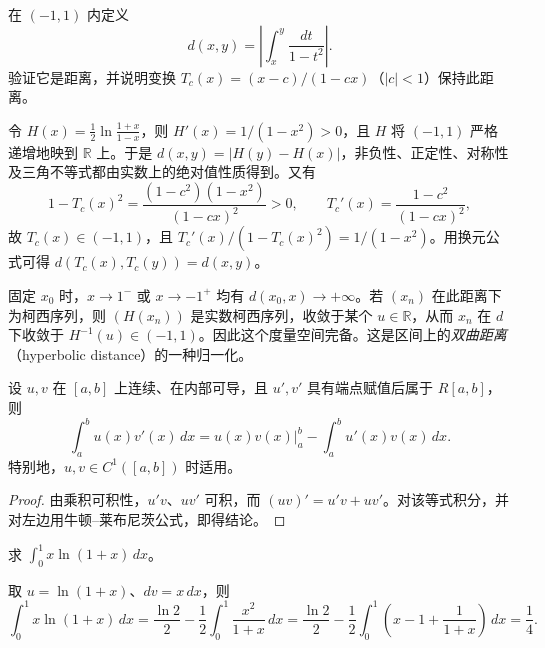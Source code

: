 \documentclass[UTF8,12pt,a4paper,fontset=fandol]{ctexbook}
\begin{document}
\begin{example}
\label{ex:hyperbolic-distance-on-interval}
在 $(-1,1)$ 内定义
\[
    d(x,y)=\left|\int_x^y\frac{dt}{1-t^2}\right|.
\]
验证它是距离，并说明变换 $T_c(x)=(x-c)/(1-cx)$（$|c|<1$）保持此距离。
\end{example}
\begin{solve}
令 $H(x)=\frac12\ln\frac{1+x}{1-x}$，则 $H'(x)=1/(1-x^2)>0$，且 $H$ 将 $(-1,1)$ 严格递增地映到 $\mathbb R$ 上。于是 $d(x,y)=|H(y)-H(x)|$，非负性、正定性、对称性及三角不等式都由实数上的绝对值性质得到。又有
\[
    1-T_c(x)^2=\frac{(1-c^2)(1-x^2)}{(1-cx)^2}>0,\qquad
    T_c'(x)=\frac{1-c^2}{(1-cx)^2},
\]
故 $T_c(x)\in(-1,1)$，且 $T_c'(x)/(1-T_c(x)^2)=1/(1-x^2)$。用换元公式可得 $d(T_c(x),T_c(y))=d(x,y)$。

固定 $x_0$ 时，$x\to1^-$ 或 $x\to-1^+$ 均有 $d(x_0,x)\to+\infty$。若 $(x_n)$ 在此距离下为柯西序列，则 $(H(x_n))$ 是实数柯西序列，收敛于某个 $u\in\mathbb R$，从而 $x_n$ 在 $d$ 下收敛于 $H^{-1}(u)\in(-1,1)$。因此这个度量空间完备。这是区间上的\emph{双曲距离}（hyperbolic distance）的一种归一化。
\end{solve}

\begin{theorem}[定积分分部积分公式]
\label{thm:definite-integration-by-parts}
设 $u,v$ 在 $[a,b]$ 上连续、在内部可导，且 $u',v'$ 具有端点赋值后属于 $R[a,b]$，则
\begin{equation}
    \int_a^b u(x)v'(x)\,dx
    =\left.u(x)v(x)\right|_a^b-\int_a^b u'(x)v(x)\,dx.
    \label{eq:definite-integration-by-parts}
\end{equation}
特别地，$u,v\in C^1([a,b])$ 时适用。
\end{theorem}
\begin{proof}
由乘积可积性，$u'v$、$uv'$ 可积，而 $(uv)'=u'v+uv'$。对该等式积分，并对左边用牛顿--莱布尼茨公式，即得结论。
\end{proof}

\begin{example}
\label{ex:integration-by-parts-logarithm}
求 $\displaystyle\int_0^1x\ln(1+x)\,dx$。
\end{example}
\begin{solve}
取 $u=\ln(1+x)$、$dv=x\,dx$，则
\[
    \int_0^1x\ln(1+x)\,dx
    =\frac{\ln2}{2}-\frac12\int_0^1\frac{x^2}{1+x}\,dx
    =\frac{\ln2}{2}-\frac12\int_0^1\left(x-1+\frac1{1+x}\right)\,dx
    =\frac14.
\]
\end{solve}
\end{document}
